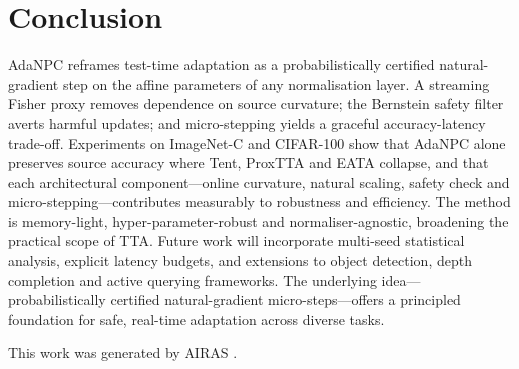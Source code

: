 \documentclass{article} %
\begin{document}
\section{Conclusion}\label{sec:conclusion}
AdaNPC reframes test-time adaptation as a probabilistically certified natural-gradient step on the affine parameters of any normalisation layer. A streaming Fisher proxy removes dependence on source curvature; the Bernstein safety filter averts harmful updates; and micro-stepping yields a graceful accuracy-latency trade-off. Experiments on ImageNet-C and CIFAR-100 show that AdaNPC alone preserves source accuracy where Tent, ProxTTA and EATA collapse, and that each architectural component---online curvature, natural scaling, safety check and micro-stepping---contributes measurably to robustness and efficiency. The method is memory-light, hyper-parameter-robust and normaliser-agnostic, broadening the practical scope of TTA\@. Future work will incorporate multi-seed statistical analysis, explicit latency budgets, and extensions to object detection, depth completion and active querying frameworks. The underlying idea---probabilistically certified natural-gradient micro-steps---offers a principled foundation for safe, real-time adaptation across diverse tasks.

This work was generated by \textsc{AIRAS} \citep{airas2025}.



\end{document}

